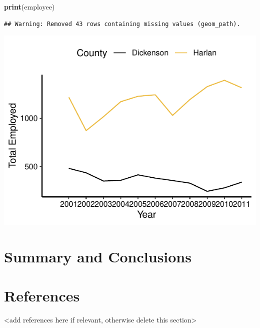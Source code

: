 \documentclass[12pt,]{article}
\newenvironment{Shaded}{\begin{snugshade}}{\end{snugshade}}
\newcommand{\KeywordTok}[1]{\textcolor[rgb]{0.13,0.29,0.53}{\textbf{#1}}}
\newcommand{\NormalTok}[1]{#1}
\begin{document}
\begin{Shaded}
\begin{Highlighting}[]
\KeywordTok{print}\NormalTok{(employee)}
\end{Highlighting}
\end{Shaded}

\begin{verbatim}
## Warning: Removed 43 rows containing missing values (geom_path).
\end{verbatim}

\includegraphics{Smith_ENV872_Project_files/figure-latex/unnamed-chunk-8-1.pdf}

\newpage

\hypertarget{summary-and-conclusions}{%
\section{Summary and Conclusions}\label{summary-and-conclusions}}

\newpage

\hypertarget{references}{%
\section{References}\label{references}}

\textless{}add references here if relevant, otherwise delete this
section\textgreater{}
\end{document}
